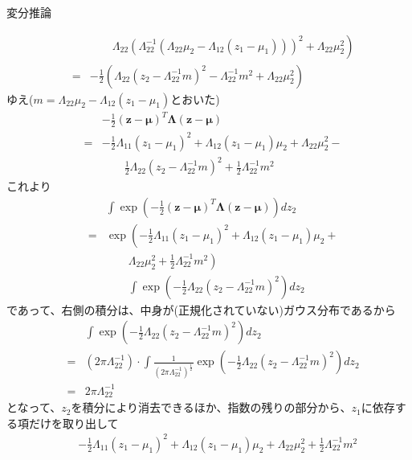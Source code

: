 \documentclass[dvipdfmx,notheorems,t]{beamer}
\begin{document}
\begin{frame}{変分推論}
\begin{itemize}
\begin{itemize}
\begin{eqnarray}
			&& \qquad \left. \Lambda_{22} \left( \Lambda_{22}^{-1} \left( \Lambda_{22} \mu_2 - \Lambda_{12} (z_1 - \mu_1) \right) \right)^2 + \Lambda_{22} \mu_2^2 \right) \\
			&=& -\frac{1}{2} \left( \Lambda_{22} \left( z_2 - \Lambda_{22}^{-1} m \right)^2 - \Lambda_{22}^{-1} m^2 + \Lambda_{22} \mu_2^2 \right)
		\end{eqnarray}
		ゆえ($m = \Lambda_{22} \mu_2 - \Lambda_{12} (z_1 - \mu_1)$とおいた)
		\begin{eqnarray}
			&& -\frac{1}{2} (\bm{z} - \bm{\mu})^T \bm{\Lambda} (\bm{z} - \bm{\mu}) \nonumber \\
			&=& -\frac{1}{2} \Lambda_{11} (z_1 - \mu_1)^2 + \Lambda_{12} (z_1 - \mu_1) \mu_2 + \Lambda_{22} \mu_2^2 - \nonumber \\
			&& \qquad \frac{1}{2} \Lambda_{22} \left( z_2 - \Lambda_{22}^{-1} m \right)^2 + \frac{1}{2} \Lambda_{22}^{-1} m^2
		\end{eqnarray}
		これより
		\begin{eqnarray}
			&& \int \exp \left( -\frac{1}{2} (\bm{z} - \bm{\mu})^T \bm{\Lambda} (\bm{z} - \bm{\mu}) \right) dz_2 \nonumber \\
			&=& \exp \left( -\frac{1}{2} \Lambda_{11} (z_1 - \mu_1)^2 + \Lambda_{12} (z_1 - \mu_1) \mu_2 + \right. \nonumber \\
			&& \qquad \left. \Lambda_{22} \mu_2^2 + \frac{1}{2} \Lambda_{22}^{-1} m^2 \right) \nonumber \\
			&& \qquad \int \exp \left( - \frac{1}{2} \Lambda_{22} \left( z_2 - \Lambda_{22}^{-1} m \right)^2 \right) dz_2
		\end{eqnarray}
		であって、右側の積分は、中身が(正規化されていない)ガウス分布であるから
		\begin{eqnarray}
			&& \int \exp \left( - \frac{1}{2} \Lambda_{22} \left( z_2 - \Lambda_{22}^{-1} m \right)^2 \right) dz_2 \nonumber \\
			&=& (2\pi \Lambda_{22}^{-1}) \cdot \int \frac{1}{(2\pi \Lambda_{22}^{-1})^\frac{1}{2}} \exp \left( - \frac{1}{2} \Lambda_{22} \left( z_2 - \Lambda_{22}^{-1} m \right)^2 \right) dz_2 \nonumber \\
			&=& 2\pi \Lambda_{22}^{-1}
		\end{eqnarray}
		となって、$z_2$を積分により消去できるほか、指数の残りの部分から、$z_1$に依存する項だけを取り出して
		\begin{eqnarray}
			&& -\frac{1}{2} \Lambda_{11} (z_1 - \mu_1)^2 + \Lambda_{12} (z_1 - \mu_1) \mu_2 + \Lambda_{22} \mu_2^2 + \frac{1}{2} \Lambda_{22}^{-1} m^2 \nonumber \\

\end{eqnarray}
\end{itemize}
\end{itemize}
\end{frame}
\end{document}

